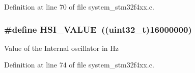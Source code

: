 Definition at line 70 of file system\+\_\+stm32f4xx.\+c.

\subsubsection[{\texorpdfstring{H\+S\+I\+\_\+\+V\+A\+L\+UE}{HSI_VALUE}}]{\setlength{\rightskip}{0pt plus 5cm}\#define H\+S\+I\+\_\+\+V\+A\+L\+UE~((uint32\+\_\+t)16000000)}\hypertarget{group___s_t_m32_f4xx___system___private___includes_gaaa8c76e274d0f6dd2cefb5d0b17fbc37}{}\label{group___s_t_m32_f4xx___system___private___includes_gaaa8c76e274d0f6dd2cefb5d0b17fbc37}
Value of the Internal oscillator in Hz 

Definition at line 74 of file system\+\_\+stm32f4xx.\+c.

